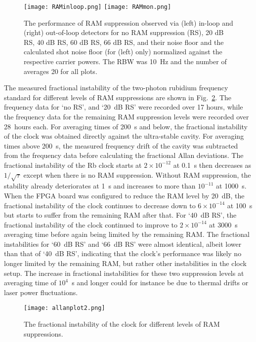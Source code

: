 \documentclass[aip,graphicx]{revtex4-2}
\begin{document}
	\begin{figure}
		\centering\texttt{[image: RAMinloop.png]}
		\texttt{[image: RAMmon.png]}
		\caption{\label{fig:RAM_inloop_mon}The performance of RAM suppression observed via (left) in-loop and (right) out-of-loop detectors for no RAM suppression (RS), 20 dB RS, 40 dB RS, 60 dB RS, 66 dB RS, and their noise floor and the calculated shot noise floor (for (left) only) normalized against the respective carrier powers. The RBW was 10~Hz and the number of averages 20 for all plots.}
	\end{figure}
	
	The measured fractional instability of the two-photon rubidium frequency standard for different levels of RAM suppressions are shown in Fig.~\ref{fig:Allan_plot}. The frequency data for `no RS', and `20~dB RS' were recorded over 17 hours, while the frequency data for the remaining RAM suppression levels were recorded over 28~hours each. For averaging times of 200~s and below, the fractional instability of the clock was obtained directly against the ultra-stable cavity. For averaging times above 200~s, the measured frequency drift of the cavity was subtracted from the frequency data before calculating the fractional Allan deviations. The fractional instability of the Rb clock starts at $2\times10^{-12}$ at 0.1~s then decreases as $1/\sqrt{\tau}$ except when there is no RAM suppression. Without RAM suppression, the stability already deteriorates at 1~s and increases to more than $10^{-11}$ at 1000~s. When the FPGA board was configured to reduce the RAM level by 20~dB, the fractional instability of the clock continues to decrease down to $6\times10^{-14}$ at 100~s but starts to suffer from the remaining RAM after that. For `40~dB RS', the fractional instability of the clock continued to improve to $2\times10^{-14}$ at 3000~s averaging time before again being limited by the remaining RAM. The fractional instabilities for `60~dB RS' and `66~dB RS' were almost identical, albeit lower than that of `40~dB RS', indicating that the clock’s performance was likely no longer limited by the remaining RAM, but rather other instabilities in the clock setup. The increase in fractional instabilities for these two suppression levels at averaging time of $10^{4}$~s and longer could for instance be due to thermal drifts or laser power fluctuations.
	
	\begin{figure}
		\centering\texttt{[image: allanplot2.png]}
		\caption{\label{fig:Allan_plot} The fractional instability of the clock for different levels of RAM suppressions.}
	\end{figure}
	
\end{document}
